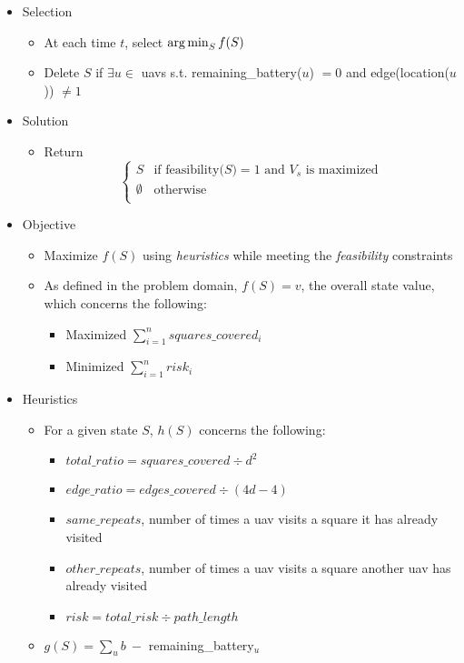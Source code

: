 \documentclass[../main.tex]{subfiles}
\begin{document}
\begin{itemize}
    \item Selection
    \begin{itemize}
        \item At each time $t$, select $\operatorname*{arg\,min}_S f(S)$
        \item Delete $S$ if $\exists u\in$ \acp{uav} s.t. remaining\_battery($u$) $=0$ and edge(location($u$)) $\neq 1$
    \end{itemize}

    \item Solution
    \begin{itemize}
        \item Return \[
            \begin{cases}
                S & \text{if feasibility(}S\text{)}=1 \text{ and }V_s\text{ is maximized} \\
                \emptyset & \text{otherwise} \\
            \end{cases}
        \]
    \end{itemize}

    \item Objective
    \begin{itemize}
        \item Maximize $f(S)$ using \textit{heuristics} while meeting the \textit{feasibility} constraints
        \item As defined in the problem domain, $f(S)=v$, the overall state value, which concerns the following: 
        \begin{itemize}
            \item Maximized $\sum_{i=1}^{n}{squares\_covered_i}$
            \item Minimized $\sum_{i=1}^{n}{risk_i}$
        \end{itemize}
    \end{itemize}

    \item Heuristics
    \begin{itemize}
        \item For a given state $S$, $h(S)$ concerns the following:
        \begin{itemize}
            \item $total\_ratio=squares\_covered\div d^2$
            \item $edge\_ratio=edges\_covered\div (4d-4)$
            \item $same\_repeats$, number of times a \ac{uav} visits a square it has already visited
            \item $other\_repeats$, number of times a \ac{uav} visits a square another \ac{uav} has already visited
            \item $risk=total\_risk\div path\_length$
        \end{itemize}
        
        \item $g(S)=\sum_u b\ -$ remaining\_battery$_u$
    \end{itemize}
\end{itemize}
\end{document}
